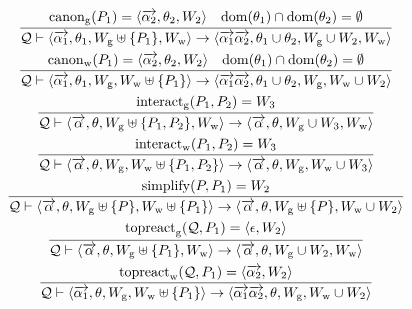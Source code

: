 \begin{gather*}
  \infer{\mathcal{Q} \vdash \langle \overrightarrow{\alpha_1}, \theta_1, W_\mathrm{g} \uplus \{P_1\}, W_\mathrm{w}\rangle \to \langle \overrightarrow{\alpha_1}\overrightarrow{\alpha_2}, \theta_1 \cup \theta_2, W_\mathrm{g} \cup W_2, W_\mathrm{w}\rangle}{
    \mathrm{canon}_\mathrm{g}(P_1) = \langle\overrightarrow{\alpha_2}, \theta_2, W_2\rangle
    &
    \dom(\theta_1) \cap \dom(\theta_2) = \emptyset
  }
  \\
  \infer{\mathcal{Q} \vdash \langle \overrightarrow{\alpha_1}, \theta_1, W_\mathrm{g}, W_\mathrm{w} \uplus \{P_1\}\rangle \to \langle \overrightarrow{\alpha_1}\overrightarrow{\alpha_2}, \theta_1 \cup \theta_2, W_\mathrm{g}, W_\mathrm{w} \cup W_2\rangle}{
    \mathrm{canon}_\mathrm{w}(P_1) = \langle\overrightarrow{\alpha_2}, \theta_2, W_2\rangle
    &
    \dom(\theta_1) \cap \dom(\theta_2) = \emptyset
  }
  \\
  \infer{\mathcal{Q} \vdash \langle \overrightarrow{\alpha}, \theta, W_\mathrm{g} \uplus \{P_1, P_2\}, W_\mathrm{w}\rangle \to \langle \overrightarrow{\alpha}, \theta, W_\mathrm{g} \cup W_3, W_\mathrm{w}\rangle}{
    \mathrm{interact}_\mathrm{g}(P_1, P_2) = W_3
  }
  \\
  \infer{\mathcal{Q} \vdash \langle \overrightarrow{\alpha}, \theta, W_\mathrm{g}, W_\mathrm{w} \uplus \{P_1, P_2\}\rangle \to \langle \overrightarrow{\alpha}, \theta, W_\mathrm{g}, W_\mathrm{w} \cup W_3\rangle}{
    \mathrm{interact}_\mathrm{w}(P_1, P_2) = W_3
  }
  \\
  \infer{\mathcal{Q} \vdash \langle \overrightarrow{\alpha}, \theta, W_\mathrm{g} \uplus \{P\}, W_\mathrm{w} \uplus \{P_1\}\rangle \to \langle \overrightarrow{\alpha}, \theta, W_\mathrm{g} \uplus \{P\}, W_\mathrm{w} \cup W_2\rangle}{
    \mathrm{simplify}(P, P_1) = W_2
  }
  \\
  \infer{\mathcal{Q} \vdash \langle \overrightarrow{\alpha}, \theta, W_\mathrm{g} \uplus \{P_1\}, W_\mathrm{w}\rangle \to \langle \overrightarrow{\alpha}, \theta, W_\mathrm{g} \cup W_2, W_\mathrm{w}\rangle}{
    \mathrm{topreact}_\mathrm{g}(\mathcal{Q}, P_1) = \langle\epsilon, W_2\rangle
  }
  \\
  \infer{\mathcal{Q} \vdash \langle \overrightarrow{\alpha_1}, \theta, W_\mathrm{g}, W_\mathrm{w} \uplus \{P_1\}\rangle \to \langle \overrightarrow{\alpha_1}\overrightarrow{\alpha_2}, \theta, W_\mathrm{g}, W_\mathrm{w} \cup W_2\rangle}{
    \mathrm{topreact}_\mathrm{w}(\mathcal{Q}, P_1) = \langle\overrightarrow{\alpha_2}, W_2\rangle
  }
\end{gather*}

